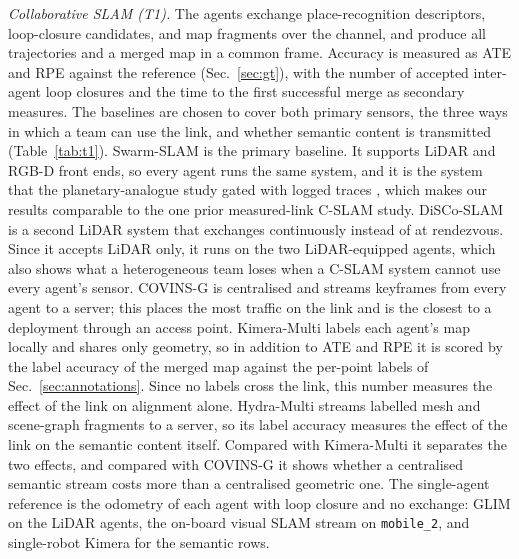 \documentclass[conference]{IEEEtran}
\begin{document}
\emph{Collaborative SLAM (T1).} The agents exchange place-recognition
descriptors, loop-closure candidates, and map fragments over the
channel, and produce all trajectories and a merged map in a common
frame. Accuracy is measured as ATE and RPE against the reference
(Sec.~\ref{sec:gt}), with the number of accepted inter-agent loop
closures and the time to the first successful merge as secondary
measures. The baselines are chosen to cover both primary sensors, the
three ways in which a team can use the link, and whether semantic
content is transmitted (Table~\ref{tab:t1}). Swarm-SLAM
\cite{swarmslam} is the primary baseline. It supports LiDAR and RGB-D
front ends, so every agent runs the same system, and it is the system
that the planetary-analogue study gated with logged traces
\cite{planetary_cslam}, which makes our results comparable to the one
prior measured-link C-SLAM study. DiSCo-SLAM \cite{discoslam} is a
second LiDAR system that exchanges continuously instead of at
rendezvous. Since it accepts LiDAR only, it runs on the two
LiDAR-equipped agents, which also shows what a heterogeneous team
loses when a C-SLAM system cannot use every agent's sensor. COVINS-G
\cite{covinsg} is centralised and streams keyframes from every agent
to a server; this places the most traffic on the link and is the
closest to a deployment through an access point. Kimera-Multi
\cite{kimeramulti} labels each agent's map locally and shares only
geometry, so in addition to ATE and RPE it is scored by the label
accuracy of the merged map against the per-point labels of
Sec.~\ref{sec:annotations}. Since no labels cross the link, this
number measures the effect of the link on alignment alone.
Hydra-Multi \cite{hydramulti} streams labelled mesh and scene-graph
fragments to a server, so its label accuracy measures the effect of
the link on the semantic content itself. Compared with Kimera-Multi
it separates the two effects, and compared with COVINS-G it shows
whether a centralised semantic stream costs more than a centralised
geometric one. The single-agent reference is the odometry of each
agent with loop closure and no exchange: GLIM \cite{glim} on the
LiDAR agents, the on-board visual SLAM stream on \texttt{mobile\_2},
and single-robot Kimera for the semantic rows.


\end{document}
